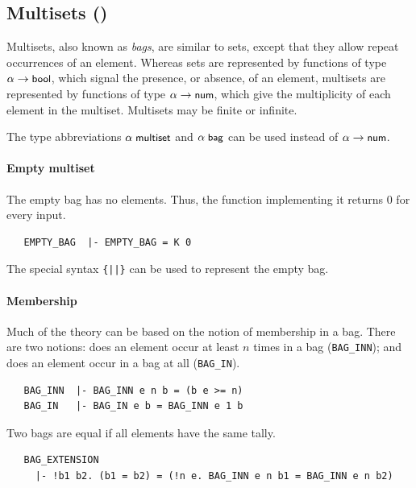 {\subsection{Multisets ()}\label{multiset}

Multisets, also known as \emph{bags}, are similar to sets, except that
they allow repeat occurrences of an element. Whereas sets are
represented by functions of type $\alpha\to\mbox{\small{\textbf{\sf{bool}}}}$, which signal
the presence, or absence, of an element, multisets are represented
by functions of type $\alpha\to\mbox{\small{\textbf{\sf{num}}}}$, which give the
multiplicity of each element in the multiset. Multisets may be finite
or infinite.

The type abbreviations $\alpha\;\mbox{\small{\textbf{\sf{multiset}}}}$ and
$\alpha\;\mbox{\small{\textbf{\sf{bag}}}}$ can be used instead of $\alpha\to\mbox{\small{\textbf{\sf{num}}}}$.

\paragraph {Empty multiset}

The empty bag has no elements. Thus, the function implementing it
returns $0$ for every input.
%
\begin{hol}
\begin{verbatim}
   EMPTY_BAG  |- EMPTY_BAG = K 0
\end{verbatim}
\end{hol}

\noindent The special syntax {\verb+{||}+} can be used to represent the empty
bag.

\paragraph {Membership}

Much of the theory can be based on the notion of membership in a
bag. There are two notions: does an element occur at least $n$ times
in a bag ({\small\verb+BAG_INN+}); and does an element occur in a bag
at all ({\small\verb+BAG_IN+}).
%
\begin{hol}
\begin{verbatim}
   BAG_INN  |- BAG_INN e n b = (b e >= n)
   BAG_IN   |- BAG_IN e b = BAG_INN e 1 b
\end{verbatim}
\end{hol}
%
Two bags are equal if all elements have the same tally.
%
\begin{hol}
\begin{verbatim}
   BAG_EXTENSION
     |- !b1 b2. (b1 = b2) = (!n e. BAG_INN e n b1 = BAG_INN e n b2)
\end{verbatim}
\end{hol}

}
